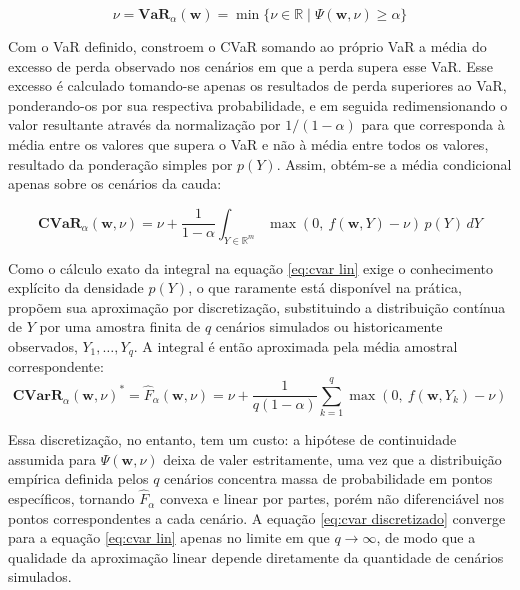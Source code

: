 \documentclass[12pt,a4paper]{article}
\begin{document}
\begin{equation}
\nu = \mathbf{VaR}_{\alpha}(\mathbf{w}) = \min\{\nu \in \mathbb{R} \mid \Psi(\mathbf{w}, \nu) \ge \alpha\}
\label{eq:var lin cvar}
\end{equation}

Com o VaR definido,  constroem o CVaR somando ao próprio VaR a média do excesso de perda observado nos cenários em que a perda supera esse VaR. Esse excesso é calculado tomando-se apenas os resultados de perda superiores ao VaR, ponderando-os por sua respectiva probabilidade, e em seguida redimensionando o valor resultante através da normalização por $1/(1-\alpha)$ para que corresponda à média entre os valores que supera o VaR e não à média entre todos os valores, resultado da ponderação simples por $p(Y)$. Assim, obtém-se a média condicional apenas sobre os cenários da cauda:

\begin{equation}
\mathbf{CVaR}_{\alpha}(\mathbf{w}, \nu) = \nu + \frac{1}{1-\alpha}\int_{Y\in\mathbb{R}^m} \max(0,\ f(\mathbf{w}, Y) - \nu) \, p(Y)\,dY
\label{eq:cvar lin}
\end{equation}

Como o cálculo exato da integral na equação \ref{eq:cvar lin} exige o conhecimento explícito da densidade $p(Y)$, o que raramente está disponível na prática,  propõem sua aproximação por discretização, substituindo a distribuição contínua de $Y$ por uma amostra finita de $q$ cenários simulados ou historicamente observados, $Y_1, \ldots, Y_q$. A integral é então aproximada pela média amostral correspondente:
\begin{equation}
\mathbf{CVarR}_\alpha(\mathbf{w}, \nu)^* = \hat{F}_\alpha(\mathbf{w}, \nu) = \nu + \frac{1}{q(1-\alpha)}\sum_{k=1}^{q} \max(0,\ f(\mathbf{w}, Y_k) - \nu)
\label{eq:cvar discretizado}
\end{equation}

Essa discretização, no entanto, tem um custo: a hipótese de continuidade assumida para $\Psi(\mathbf{w}, \nu)$ deixa de valer estritamente, uma vez que a distribuição empírica definida pelos $q$ cenários concentra massa de probabilidade em pontos específicos, tornando $\hat{F}_\alpha$ convexa e linear por partes, porém não diferenciável nos pontos correspondentes a cada cenário. A equação \ref{eq:cvar discretizado} converge para a equação \ref{eq:cvar lin} apenas no limite em que $q \to \infty$, de modo que a qualidade da aproximação linear depende diretamente da quantidade de cenários simulados.
\end{document}
